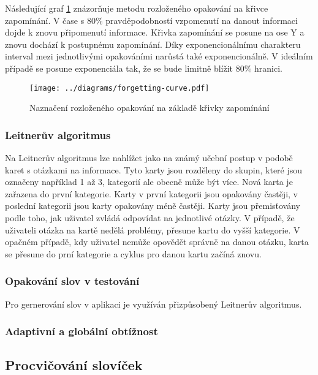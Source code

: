 \documentclass[a4paper,11pt,titlepage,fleqn]{article}
\begin{document}
		Následující graf \ref{fig:forgetting-curve} znázorňuje metodu rozloženého opakování na křivce zapomínání. V čase s 80\% pravděpodobností vzpomenutí na danout informaci dojde k znovu připomenutí informace. Křivka zapomínání se posune na ose Y a znovu dochází k postupnému zapomínání. Díky exponencionálnímu charakteru interval mezi jednotlivými opakováními narůstá také exponencionálně. V ideálním případě se posune exponenciála tak, že se bude limitně blížit 80\% hranici.

        \begin{figure}[ht!]
            \centering
            \texttt{[image: ../diagrams/forgetting-curve.pdf]}
            \caption{Naznačení rozloženého opakování na základě křivky zapomínání}
            \label{fig:forgetting-curve}
        \end{figure}
         
        \subsubsection{Leitnerův algoritmus}
	Na Leitnerův algoritmus lze nahlížet jako na známý učební postup v podobě karet s otázkami na informace. Tyto karty jsou rozděleny do skupin, které jsou označeny například 1 až 3, kategorií ale obecně může být více. Nová karta je zařazena do první kategorie. Karty v první kategorii jsou opakovány častěji, v poslední kategorii jsou karty opakovány méně častěji. Karty jsou přemisťovány podle toho, jak uživatel zvládá odpovídat na jednotlivé otázky. V případě, že uživateli otázka na kartě nedělá problémy, přesune kartu do vyšší kategorie. V opačném případě, kdy uživatel nemůže opovědět správně na danou otázku, karta se přesune do prní kategorie a cyklus pro danou kartu začíná znovu.    

        \subsubsection{Opakování slov v testování}
            \label{repeating}
	Pro gernerování slov v aplikaci je využíván přizpůsobený Leitnerův algoritmus. 

        \subsubsection{Adaptivní a globální obtížnost}


    \subsection{Procvičování slovíček}
\end{document}
